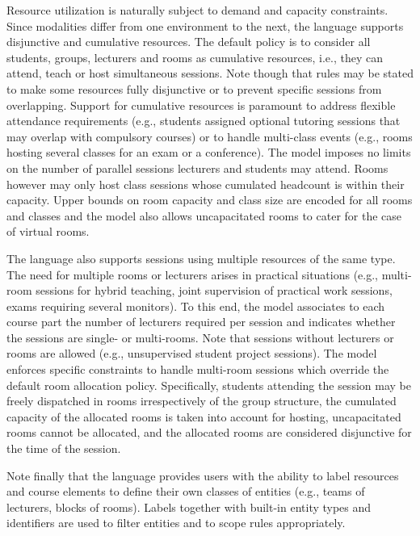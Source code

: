 Resource utilization is naturally subject to demand and capacity constraints.
Since modalities differ from one environment to the next, the language supports disjunctive and cumulative resources. The default policy is to consider all students, groups, lecturers and rooms as cumulative resources, i.e., they can attend, teach or host simultaneous sessions. Note though that rules may be stated to make some resources fully disjunctive or to prevent specific sessions from overlapping. Support for cumulative resources is paramount to address flexible attendance requirements (e.g., students assigned optional tutoring sessions that may overlap with compulsory courses) or to handle multi-class events (e.g., rooms hosting several classes for an exam or a conference). The model imposes no limits on the number of parallel sessions lecturers and students may attend. Rooms however may only host class sessions whose cumulated headcount is within their capacity. Upper bounds on room capacity and class size are encoded for all rooms and classes and the model also allows uncapacitated rooms to cater for the case of virtual rooms.

The language also supports sessions using multiple resources of the same type. %
The need for multiple rooms or lecturers arises in practical situations (e.g., multi-room sessions for hybrid teaching, joint supervision of practical work sessions, exams requiring several monitors). %
To this end, the model associates to each course part the number of lecturers required per session 
and indicates whether the sessions are single- or multi-rooms.
Note that sessions without lecturers or rooms are allowed (e.g., unsupervised student project sessions).
The model enforces specific constraints to handle multi-room sessions which override the default room allocation policy. Specifically, students attending the session may be freely dispatched in rooms irrespectively of the group structure, the cumulated capacity of the allocated rooms is taken into account for hosting, uncapacitated rooms cannot be allocated, and 
the allocated rooms are considered disjunctive for the time of the session.

Note finally that the language provides users with the ability to label resources and course elements to define their own classes of entities (e.g., teams of lecturers, blocks of rooms). Labels together with built-in entity types and identifiers are used to filter entities and to scope rules appropriately.
 


